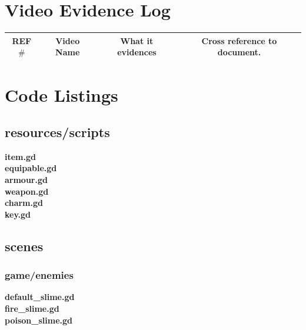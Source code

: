 \documentclass{article}
\begin{document}
\section{Video Evidence Log}
\begin{tabular}{|c|c|c|c|}
        \hline
        REF$\#$&Video Name&What it evidences&Cross reference to document.\\
        \hline
        \hline
\end{tabular}
\newpage
{}
\section{Code Listings}
\subsection{resources/scripts}
\textbf{item.gd}\\

\textbf{equipable.gd}\\

\textbf{armour.gd}\\

\textbf{weapon.gd}\\

\textbf{charm.gd}\\

\newpage
\textbf{key.gd}\\

\subsection{scenes}
\subsubsection{game/enemies}
\textbf{default\_slime.gd}\\

\textbf{fire\_slime.gd}\\

\textbf{poison\_slime.gd}\\

\end{document}
